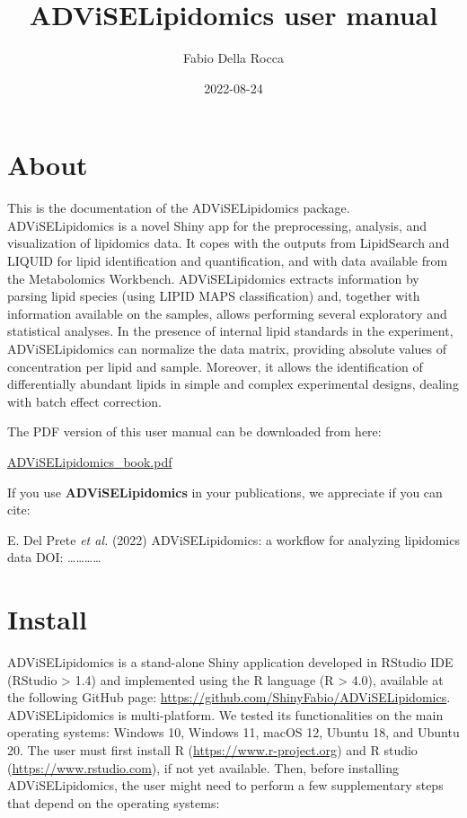 \documentclass[
]{book}
\title{ADViSELipidomics user manual}
\author{Fabio Della Rocca}
\date{2022-08-24}
\begin{document}
\maketitle

{
\setcounter{tocdepth}{1}
\tableofcontents
}
\hypertarget{about}{%
\chapter{About}\label{about}}

This is the documentation of the ADViSELipidomics package. ADViSELipidomics is a novel Shiny app for the preprocessing, analysis, and visualization of lipidomics data. It copes with the outputs from LipidSearch and LIQUID for lipid identification and quantification, and with data available from the Metabolomics Workbench. ADViSELipidomics extracts information by parsing lipid species (using LIPID MAPS classification) and, together with information available on the samples, allows performing several exploratory and statistical analyses. In the presence of internal lipid standards in the experiment, ADViSELipidomics can normalize the data matrix, providing absolute values of concentration per lipid and sample. Moreover, it allows the identification of differentially abundant lipids in simple and complex experimental designs, dealing with batch effect correction.

The PDF version of this user manual can be downloaded from here:

\href{https://github.com/ShinyFabio/ADViSELipidomics_book/raw/main/docs/ADViSELipidomics_book.pdf}{ADViSELipidomics\_book.pdf}

If you use \textbf{ADViSELipidomics} in your publications, we appreciate if you can cite:

E. Del Prete \emph{et al.} (2022) ADViSELipidomics: a workflow for analyzing lipidomics data DOI: \ldots\ldots\ldots\ldots{}

\hypertarget{install}{%
\chapter{Install}\label{install}}

ADViSELipidomics is a stand-alone Shiny application developed in RStudio IDE (RStudio \textgreater{} 1.4) and implemented using the R language (R \textgreater{} 4.0), available at the following GitHub page: \url{https://github.com/ShinyFabio/ADViSELipidomics}. ADViSELipidomics is multi-platform. We tested its functionalities on the main operating systems: Windows 10, Windows 11, macOS 12, Ubuntu 18, and Ubuntu 20.
The user must first install R (\url{https://www.r-project.org}) and R studio (\url{https://www.rstudio.com}), if not yet available. Then, before installing ADViSELipidomics, the user might need to perform a few supplementary steps that depend on the operating systems:
\end{document}
